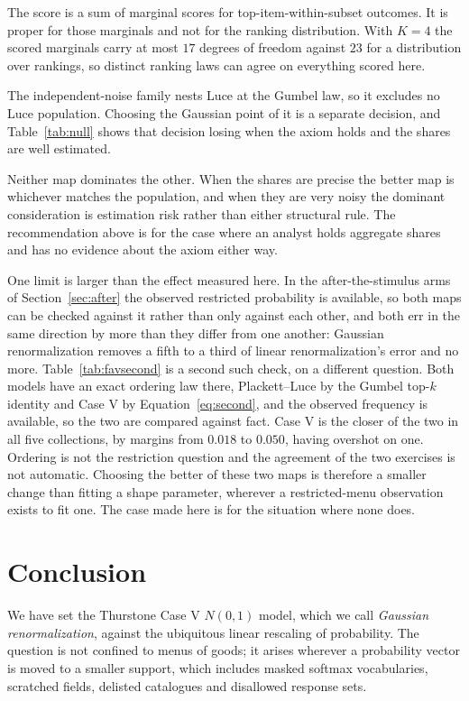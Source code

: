 \documentclass[11pt]{article}
\begin{document}
The score is a sum of marginal scores for top-item-within-subset outcomes. It is proper
for those marginals and not for the ranking distribution. With $K = 4$ the scored
marginals carry at most $17$ degrees of freedom against $23$ for a distribution over
rankings, so distinct ranking laws can agree on everything scored here.

The independent-noise family nests Luce at the Gumbel law, so it excludes no Luce population.
Choosing the Gaussian point of it is a separate decision, and Table~\ref{tab:null} shows that
decision losing when the axiom holds and the shares are well estimated.

Neither map dominates the other. When the shares are precise the better map is whichever
matches the population, and when they are very noisy the dominant consideration is estimation
risk rather than either structural rule. The recommendation above is for the case where an
analyst holds aggregate shares and has no evidence about the axiom either way.

One limit is larger than the effect measured here. In the after-the-stimulus arms of
Section~\ref{sec:after} the observed restricted probability is available, so both maps can be
checked against it rather than only against each other, and both err in the same direction by
more than they differ from one another: Gaussian renormalization removes a fifth to a third of
linear renormalization's error and no more. Table~\ref{tab:favsecond} is a second such check, on
a different question. Both models have an exact ordering law there, Plackett--Luce by the Gumbel
top-$k$ identity and Case V by Equation~\eqref{eq:second}, and the observed frequency is
available, so the two are compared against fact. Case V is the closer of the two in all five
collections, by margins from $0.018$ to $0.050$, having overshot on one. Ordering is not the
restriction question and the agreement of the two exercises is not automatic.
Choosing the better of these two maps is therefore a smaller change than fitting a shape
parameter, wherever a restricted-menu observation exists to fit one. The
case made here is for the situation where none does.

\section{Conclusion}
\label{sec:conclusion}

We have set the Thurstone Case V $N(0,1)$ model, which we call \emph{Gaussian renormalization},
against the ubiquitous linear rescaling of probability. The question is not confined to menus of
goods; it arises wherever a probability vector is moved to a smaller support, which includes
masked softmax vocabularies, scratched fields, delisted catalogues and disallowed response sets.
\end{document}
